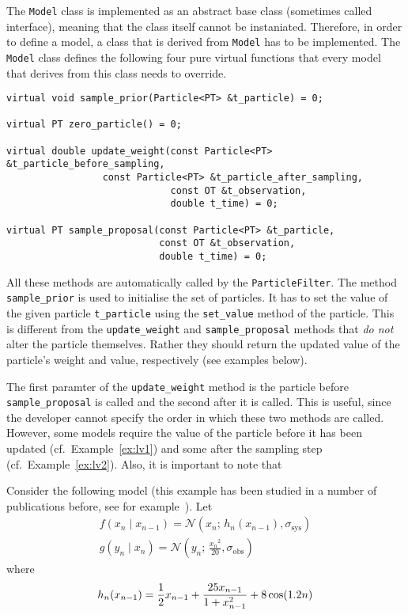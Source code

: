 The \texttt{Model} class is implemented as an abstract base class
(sometimes called interface), meaning that the class itself cannot be
instaniated. Therefore, in order to define a model, a class that is
derived from \texttt{Model} has to be implemented. The \texttt{Model}
class defines the following four pure virtual functions that every
model that derives from this class needs to override.
\begin{verbatim}
virtual void sample_prior(Particle<PT> &t_particle) = 0;

virtual PT zero_particle() = 0;

virtual double update_weight(const Particle<PT> &t_particle_before_sampling,
			     const Particle<PT> &t_particle_after_sampling,
                             const OT &t_observation,
                             double t_time) = 0;

virtual PT sample_proposal(const Particle<PT> &t_particle,
                           const OT &t_observation,
                           double t_time) = 0;
\end{verbatim}

All these methods are automatically called by the
\texttt{ParticleFilter}. The method \texttt{sample\_prior} is used to
initialise the set of particles. It has to set the value of the given
particle \texttt{t\_particle} using the \texttt{set\_value} method of
the particle. This is different from the \texttt{update\_weight} and
\texttt{sample\_proposal} methods that \emph{do not} alter the
particle themselves. Rather they should return the updated value of
the particle's weight and value, respectively (see examples below).

The first paramter of the \texttt{update\_weight} method is the
particle before \texttt{sample\_proposal} is called and the second
after it is called. This is useful, since the developer cannot specify
the order in which these two methods are called. However, some models
require the value of the particle before it has been updated (cf.\
Example~\ref{ex:lv1}) and some after the sampling step (cf.\
Example~\ref{ex:lv2}). Also, it is important to note that

\begin{example}
  Consider the following model (this example has been studied in a
  number of publications before, see for
  example~\cite{arulampalam,gordon,kitagawa}). Let
  \begin{gather*}
    f(x_n \mid x_{n-1}) = \mathcal{N}(x_n;\, h_n(x_{n-1}), \sigma_{\text{sys}})\\
    g(y_n \mid x_n) = \mathcal{N}(y_n;\, \frac{{x_n}^2}{20},
    \sigma_{\text{obs}})
  \end{gather*}
  where
  \[
    h_n(x_{n-1}) = \frac{1}{2}x_{n-1} + \frac{25 x_{n-1}}{1 + x_{n-1}^2} + 8 \cos(1.2n) \\
  \]
\end{example}

\begin{example}\label{ex:lv1}
\end{example}

\begin{example}\label{ex:lv2}
  
\end{example}

